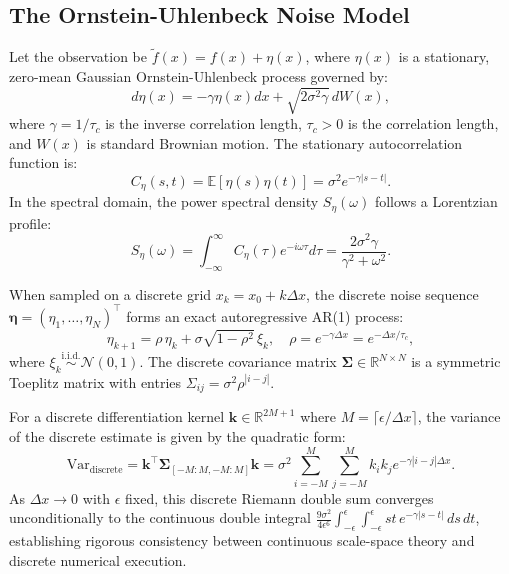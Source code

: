 \documentclass[11pt,a4paper]{article}
\theoremstyle{definition}
\begin{document}
\subsection{The Ornstein-Uhlenbeck Noise Model}
Let the observation be $\tilde{f}(x) = f(x) + \eta(x)$, where $\eta(x)$ is a stationary, zero-mean Gaussian Ornstein-Uhlenbeck process governed by:
\begin{equation}
d\eta(x) = -\gamma \eta(x) dx + \sqrt{2\sigma^2 \gamma} \, dW(x),
\label{eq:ou_sde}
\end{equation}
where $\gamma = 1 / \tau_c$ is the inverse correlation length, $\tau_c > 0$ is the correlation length, and $W(x)$ is standard Brownian motion. The stationary autocorrelation function is:
\begin{equation}
C_\eta(s, t) = \mathbb{E}[\eta(s)\eta(t)] = \sigma^2 e^{-\gamma |s - t|}.
\label{eq:ou_covariance}
\end{equation}
In the spectral domain, the power spectral density $S_\eta(\omega)$ follows a Lorentzian profile:
\begin{equation}
S_\eta(\omega) = \int_{-\infty}^\infty C_\eta(\tau) e^{-i\omega \tau} d\tau = \frac{2\sigma^2 \gamma}{\gamma^2 + \omega^2}.
\end{equation}

When sampled on a discrete grid $x_k = x_0 + k \Delta x$, the discrete noise sequence $\bm{\eta} = (\eta_1, \dots, \eta_N)^\top$ forms an exact autoregressive AR(1) process:
\begin{equation}
\eta_{k+1} = \rho \, \eta_k + \sigma \sqrt{1 - \rho^2} \, \xi_k, \quad \rho = e^{-\gamma \Delta x} = e^{-\Delta x / \tau_c},
\end{equation}
where $\xi_k \stackrel{\text{i.i.d.}}{\sim} \mathcal{N}(0, 1)$. The discrete covariance matrix $\bm{\Sigma} \in \mathbb{R}^{N \times N}$ is a symmetric Toeplitz matrix with entries $\Sigma_{ij} = \sigma^2 \rho^{|i - j|}$.

For a discrete differentiation kernel $\mathbf{k} \in \mathbb{R}^{2M+1}$ where $M = \lceil \epsilon / \Delta x \rceil$, the variance of the discrete estimate is given by the quadratic form:
\begin{equation}
\text{Var}_{\text{discrete}} = \mathbf{k}^\top \bm{\Sigma}_{[-M:M, -M:M]} \mathbf{k} = \sigma^2 \sum_{i=-M}^M \sum_{j=-M}^M k_i k_j e^{-\gamma |i - j| \Delta x}.
\label{eq:discrete_quadratic_form}
\end{equation}
As $\Delta x \to 0$ with $\epsilon$ fixed, this discrete Riemann double sum converges unconditionally to the continuous double integral $\frac{9\sigma^2}{4\epsilon^6} \int_{-\epsilon}^\epsilon \int_{-\epsilon}^\epsilon st \, e^{-\gamma |s - t|} \, ds \, dt$, establishing rigorous consistency between continuous scale-space theory and discrete numerical execution.
\end{document}
